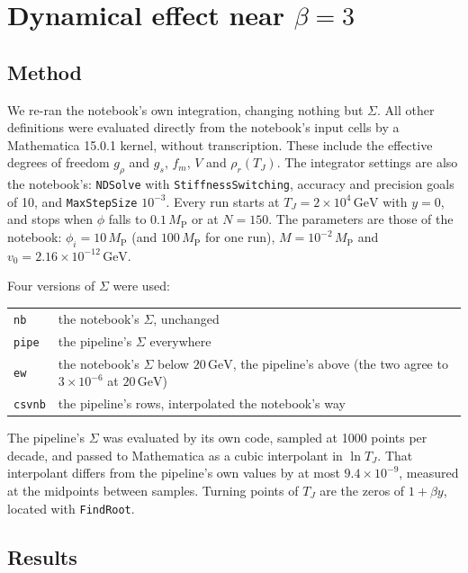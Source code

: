 \documentclass[11pt,a4paper]{article}
\newcommand{\MP}{M_{\mathrm{P}}}
\newcommand{\TJ}{T_{J}}
\newcommand{\GeV}{\,\mathrm{GeV}}
\newcommand{\code}[1]{\texttt{#1}}
\begin{document}
\section{Dynamical effect near \texorpdfstring{$\beta = 3$}{beta = 3}}
\label{sec:dynamics}

\subsection{Method}

We re-ran the notebook's own integration, changing nothing but $\Sigma$. All other definitions
were evaluated directly from the notebook's input cells by a Mathematica 15.0.1 kernel, without
transcription. These include the effective degrees of freedom $g_\rho$ and $g_s$, $f_m$,
$V$ and $\rho_r(\TJ)$. The integrator settings are also the notebook's: \code{NDSolve} with
\code{StiffnessSwitching}, accuracy and precision goals of 10, and \code{MaxStepSize}
$10^{-3}$. Every run starts at $\TJ = 2\times10^4\GeV$ with $y = 0$, and stops when $\phi$
falls to $0.1\,\MP$ or at $N = 150$. The parameters are those of the notebook: $\phi_i =
10\,\MP$ (and $100\,\MP$ for one run), $M = 10^{-2}\,\MP$ and $v_0 = 2.16\times10^{-12}\GeV$.

Four versions of $\Sigma$ were used:
\begin{center}\small
\begin{tabular}{@{}ll@{}}
\toprule
\code{nb} & the notebook's $\Sigma$, unchanged \\
\code{pipe} & the pipeline's $\Sigma$ everywhere \\
\code{ew} & the notebook's $\Sigma$ below $20\GeV$, the pipeline's above (the two agree to $3\times10^{-6}$ at $20\GeV$) \\
\code{csvnb} & the pipeline's rows, interpolated the notebook's way \\
\bottomrule
\end{tabular}
\end{center}
The pipeline's $\Sigma$ was evaluated by its own code, sampled at 1000 points per decade, and
passed to Mathematica as a cubic interpolant in $\ln\TJ$. That interpolant differs from the
pipeline's own values by at most $9.4\times10^{-9}$, measured at the midpoints between samples.
Turning points of $\TJ$ are the zeros of $1+\beta y$, located with \code{FindRoot}.

\subsection{Results}
\end{document}
